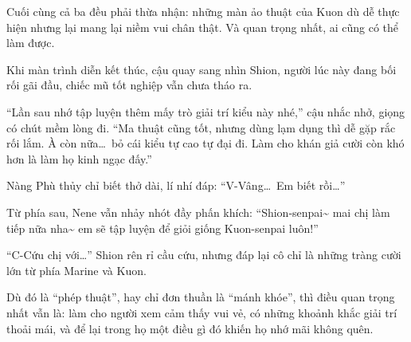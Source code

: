 \documentclass[../main.tex]{subfiles}
\begin{document}
Cuối cùng cả ba đều phải thừa nhận: những màn ảo thuật của Kuon dù dễ thực hiện nhưng lại mang lại niềm vui chân thật. Và quan trọng nhất, ai cũng có thể làm được.

Khi màn trình diễn kết thúc, cậu quay sang nhìn Shion, người lúc này đang bối rối gãi đầu, chiếc mũ tốt nghiệp vẫn chưa tháo ra.

``Lần sau nhớ tập luyện thêm mấy trò giải trí kiểu này nhé,'' cậu nhắc nhở, giọng có chút mềm lòng đi. ``Ma thuật cũng tốt, nhưng dùng lạm dụng thì dễ gặp rắc rối lắm. À còn nữa\dots\ bỏ cái kiểu tự cao tự đại đi. Làm cho khán giả cười còn khó hơn là làm họ kinh ngạc đấy.''

Nàng Phù thủy chỉ biết thở dài, lí nhí đáp: ``V-Vâng\dots\ Em biết rồi\dots''

Từ phía sau, Nene vẫn nhảy nhót đầy phấn khích: ``Shion-senpai\~{} mai chị làm tiếp nữa nha\~{} em sẽ tập luyện để giỏi giống Kuon-senpai luôn!''

``C-Cứu chị với\dots'' Shion rên rỉ cầu cứu, nhưng đáp lại cô chỉ là những tràng cười lớn từ phía Marine và Kuon.


Dù đó là ``phép thuật'', hay chỉ đơn thuần là ``mánh khóe'', thì điều quan trọng nhất vẫn là: làm cho người xem cảm thấy vui vẻ, có những khoảnh khắc giải trí thoải mái, và để lại trong họ một điều gì đó khiến họ nhớ mãi không quên.
\end{document}
